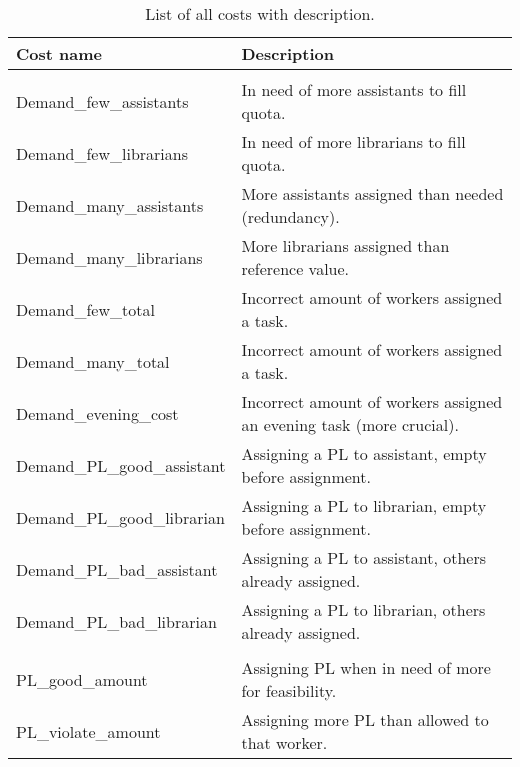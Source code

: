 \begin{table}[!h]
\centering
\caption{List of all costs with description.}
\label{tab:all_costs}
\begin{tabular}{|l|l|}
\hline
\rowcolor[HTML]{C0C0C0} 
Cost name                                      & Description       \\ \hline
\rowcolor[HTML]{FD6864} 
\multicolumn{2}{|c|}{\cellcolor[HTML]{FD6864}Demand costs}    \\ \hline
Demand\_few\_assistants                        & In need of more assistants to fill quota.                  \\ \hline
Demand\_few\_librarians                        & In need of more librarians to fill quota.                 \\ \hline
Demand\_many\_assistants                       & More assistants assigned than needed (redundancy).           \\ \hline
Demand\_many\_librarians                       & More librarians assigned than reference value.                  \\ \hline
Demand\_few\_total                             & Incorrect amount of workers assigned a task.                  \\ \hline
Demand\_many\_total                            & Incorrect amount of workers assigned a task.                  \\ \hline
Demand\_evening\_cost         & Incorrect amount of workers assigned an evening task (more crucial).\\ \hline
Demand\_PL\_good\_assistant        & Assigning a PL to assistant, empty before assignment.            \\ \hline
Demand\_PL\_good\_librarian        & Assigning a PL to librarian, empty before assignment.           \\ \hline
Demand\_PL\_bad\_assistant         & Assigning a PL to assistant, others already assigned.           \\ \hline
Demand\_PL\_bad\_librarian         & Assigning a PL to librarian, others already assigned.             \\ \hline
\rowcolor[HTML]{FD6864} 
\multicolumn{2}{|c|}{\cellcolor[HTML]{FD6864}PL amount costs} \\ \hline
PL\_good\_amount                  & Assigning PL when in need of more for feasibility.                  \\ \hline
PL\_violate\_amount             & Assigning more PL than allowed to that worker.                  \\ \hline

\end{tabular}
\end{table}
